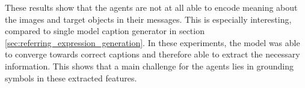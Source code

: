 These results show that the agents are not at all able to encode meaning about the images and target objects in their messages.
This is especially interesting, compared to single model caption generator in section \ref{sec:referring_expression_generation}.
In these experiments, the model was able to converge towards correct captions and therefore able to extract the necessary information.
This shows that a main challenge for the agents lies in grounding symbols in these extracted features.
